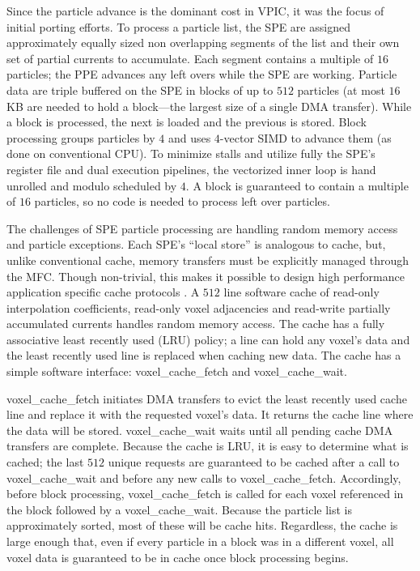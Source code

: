 \documentclass[journal,twoside]{IEEEtran}
\begin{document}
Since the particle advance is the dominant cost in VPIC, it was the
focus of initial porting efforts.  To process a particle list, the SPE
are assigned approximately equally sized non overlapping segments of
the list and their own set of partial currents to accumulate.  Each
segment contains a multiple of $16$ particles; the PPE advances any
left overs while the SPE are working.  Particle data are triple
buffered on the SPE in blocks of up to $512$ particles (at most $16$
KB are needed to hold a block---the largest size of a single DMA
transfer).  While a block is processed, the next is loaded and the
previous is stored.
Block processing groups particles by $4$ and uses $4$-vector SIMD to
advance them (as done on conventional CPU).  To minimize stalls and
utilize fully the SPE's register file and dual execution pipelines,
the vectorized inner loop is hand unrolled and modulo scheduled by
$4$.  A block is guaranteed to contain a multiple of $16$ particles,
so no code is needed to process left over particles.

The challenges of SPE particle processing are handling random memory
access and particle exceptions.  Each SPE's ``local store'' is
analogous to cache, but, unlike conventional cache, memory transfers
must be explicitly managed through the MFC.  Though non-trivial, this
makes it possible to design high performance application specific
cache protocols \cite{Kahle_et_al_2005}.  A $512$ line software cache
of read-only interpolation coefficients, read-only voxel adjacencies
and read-write partially accumulated currents handles random memory
access.  The cache has a fully associative least recently used (LRU)
policy; a line can hold any voxel's data and the least recently used
line is replaced when caching new data.  The cache has a simple
software interface: voxel\_cache\_fetch and voxel\_cache\_wait.

voxel\_cache\_fetch initiates DMA transfers to evict the least
recently used cache line and replace it with the requested voxel's
data.  It returns the cache line where the data will be stored.
voxel\_cache\_wait waits until all pending cache DMA transfers are
complete.  Because the cache is LRU, it is easy to determine what is
cached; the last $512$ unique requests are guaranteed to be cached
after a call to voxel\_cache\_wait and before any new calls to
voxel\_cache\_fetch.  Accordingly, before block processing,
voxel\_cache\_fetch is called for each voxel referenced in the block
followed by a voxel\_cache\_wait.  Because the particle list is
approximately sorted, most of these will be cache hits.  Regardless,
the cache is large enough that, even if every particle in a block was
in a different voxel, all voxel data is guaranteed to be in cache once
block processing begins.
\end{document}
